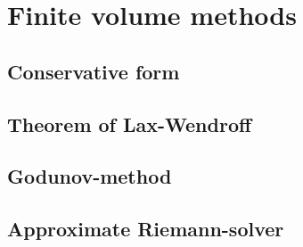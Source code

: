 \section{Finite volume methods}


\subsection{Conservative form}


\subsection{Theorem of Lax-Wendroff}


\subsection{Godunov-method}


\subsection{Approximate Riemann-solver}
